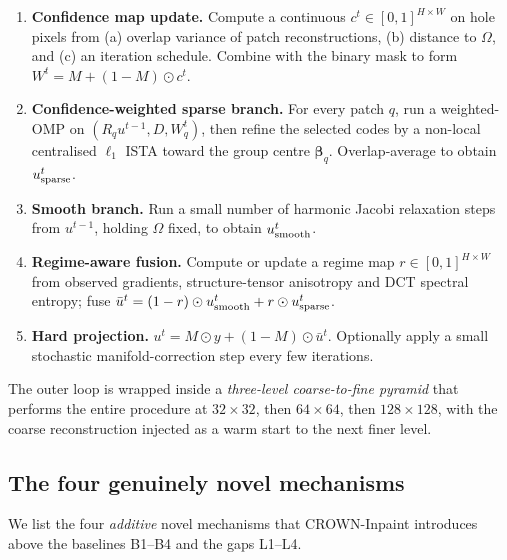 \documentclass[11pt,a4paper]{article}
\theoremstyle{definition}
\theoremstyle{remark}
\begin{document}
\begin{enumerate}[label=\textbf{Step \arabic*.},leftmargin=4.2em,itemsep=3pt]
\item \textbf{Confidence map update.} Compute a continuous $c^t\in[0,1]^{H\times W}$ on
hole pixels from (a) overlap variance of patch reconstructions, (b)
distance to $\Omega$, and (c) an iteration schedule. Combine with the
binary mask to form $W^t = M+(1-M)\odot c^t$.
\item \textbf{Confidence-weighted sparse branch.} For every patch
$q$, run a weighted-OMP on $(R_q u^{t-1}, D, W^t_q)$, then refine the
selected codes by a non-local centralised $\ell_1$ ISTA toward the
group centre $\bm{\beta}_q$. Overlap-average to obtain
$u^t_{\rm sparse}$.
\item \textbf{Smooth branch.} Run a small number of harmonic Jacobi
relaxation steps from $u^{t-1}$, holding $\Omega$ fixed, to obtain
$u^t_{\rm smooth}$.
\item \textbf{Regime-aware fusion.} Compute or update a regime map
$r\in[0,1]^{H\times W}$ from observed gradients, structure-tensor
anisotropy and DCT spectral entropy; fuse
$\bar u^t = (1-r)\odot u^t_{\rm smooth} + r\odot u^t_{\rm sparse}$.
\item \textbf{Hard projection.}
$u^t = M\odot y + (1-M)\odot \bar u^t$. Optionally apply a small
stochastic manifold-correction step every few iterations.
\end{enumerate}

The outer loop is wrapped inside a \emph{three-level coarse-to-fine
pyramid} that performs the entire procedure at $32\times 32$, then
$64\times 64$, then $128\times 128$, with the coarse reconstruction
injected as a warm start to the next finer level.

\subsection{The four genuinely novel mechanisms}

We list the four \emph{additive} novel mechanisms that CROWN-Inpaint
introduces above the baselines B1--B4 and the gaps L1--L4.
\end{document}
